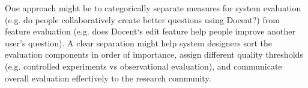One approach might be to categorically separate measures for system evaluation (e.g. do people collaboratively create better questions using Docent?) from feature evaluation (e.g. does Docent‘s edit feature help people improve another user’s question). A clear separation might help system designers sort the evaluation components in order of importance, assign different quality thresholds (e.g. controlled experiments vs observational evaluation), and communicate overall evaluation effectively to the research community.





